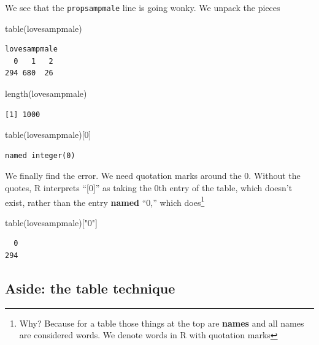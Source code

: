 \documentclass[
  letterpaper,
  DIV=11,
  numbers=noendperiod]{scrreprt}
\newenvironment{Shaded}{\begin{snugshade}}{\end{snugshade}}
\newcommand{\DecValTok}[1]{\textcolor[rgb]{0.25,0.63,0.44}{#1}}
\newcommand{\FunctionTok}[1]{\textcolor[rgb]{0.02,0.16,0.49}{#1}}
\newcommand{\NormalTok}[1]{\textcolor[rgb]{0.00,0.44,0.13}{#1}}
\newcommand{\StringTok}[1]{\textcolor[rgb]{0.25,0.44,0.63}{#1}}
\begin{document}
We see that the \texttt{propsampmale} line is going wonky. We unpack the
pieces

\begin{Shaded}
\begin{Highlighting}[]
\FunctionTok{table}\NormalTok{(lovesampmale)}
\end{Highlighting}
\end{Shaded}

\begin{verbatim}
lovesampmale
  0   1   2 
294 680  26 
\end{verbatim}

\begin{Shaded}
\begin{Highlighting}[]
\FunctionTok{length}\NormalTok{(lovesampmale)}
\end{Highlighting}
\end{Shaded}

\begin{verbatim}
[1] 1000
\end{verbatim}

\begin{Shaded}
\begin{Highlighting}[]
\FunctionTok{table}\NormalTok{(lovesampmale)[}\DecValTok{0}\NormalTok{]}
\end{Highlighting}
\end{Shaded}

\begin{verbatim}
named integer(0)
\end{verbatim}

We finally find the error. We need quotation marks around the 0. Without
the quotes, R interprets ``{[}0{]}'' as taking the 0th entry of the
table, which doesn't exist, rather than the entry \textbf{named} ``0,''
which does\footnote{Why? Because for a table those things at the top are
  \textbf{names} and all names are considered words. We denote words in
  R with quotation marks}

\begin{Shaded}
\begin{Highlighting}[]
\FunctionTok{table}\NormalTok{(lovesampmale)[}\StringTok{"0"}\NormalTok{]}
\end{Highlighting}
\end{Shaded}

\begin{verbatim}
  0 
294 
\end{verbatim}

\hypertarget{aside-the-table-technique}{%
\subsection{Aside: the table
technique}\label{aside-the-table-technique}}
\end{document}
